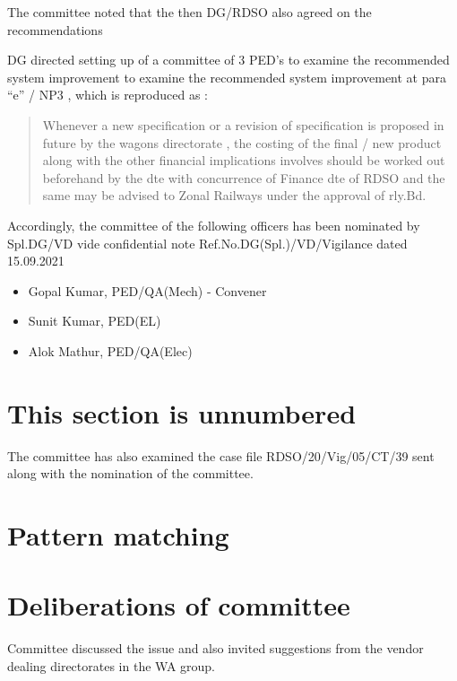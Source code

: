 \documentclass[
  11pt,
  twoside]{article}
\providecommand{\tightlist}{%
  \setlength{\itemsep}{0pt}\setlength{\parskip}{0pt}}
\begin{document}
The committee noted that the then DG/RDSO also agreed on the recommendations

DG directed setting up of a committee of 3 PED's to examine the recommended system improvement to examine the recommended system improvement at para ``e'' / NP3 , which is reproduced as :

\begin{quote}
Whenever a new specification or a revision of specification is proposed in future by the wagons directorate , the costing of the final / new product along with the other financial implications involves should be worked out beforehand by the dte with concurrence of Finance dte of RDSO and the same may be advised to Zonal Railways under the approval of rly.Bd.
\end{quote}

Accordingly, the committee of the following officers has been nominated by Spl.DG/VD vide confidential note Ref.No.DG(Spl.)/VD/Vigilance dated 15.09.2021

\begin{itemize}
\tightlist
\item
  Gopal Kumar, PED/QA(Mech) - Convener
\item
  Sunit Kumar, PED(EL)
\item
  Alok Mathur, PED/QA(Elec)
\end{itemize}

\hypertarget{this-section-is-unnumbered}{%
\section*{This section is unnumbered}\label{this-section-is-unnumbered}}

The committee has also examined the case file RDSO/20/Vig/05/CT/39 sent along with the nomination of the committee.

\hypertarget{pattern-matching}{%
\section{Pattern matching}\label{pattern-matching}}

\hypertarget{deliberations-of-committee}{%
\section{Deliberations of committee}\label{deliberations-of-committee}}

Committee discussed the issue and also invited suggestions from the vendor dealing directorates in the WA group.
\end{document}
